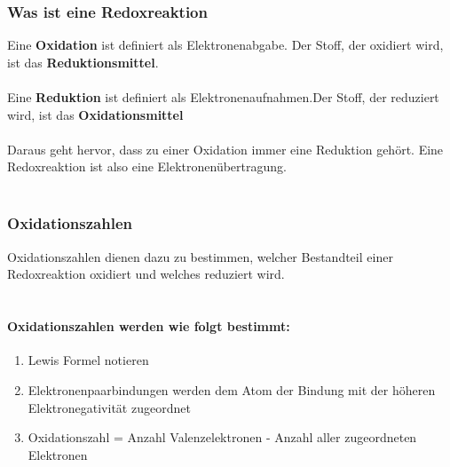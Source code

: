 \documentclass[a4paper]{report}
\begin{document}
\subsubsection{Was ist eine Redoxreaktion}
Eine \textbf{Oxidation} ist definiert als Elektronenabgabe. Der Stoff, der oxidiert wird, ist das \textbf{Reduktionsmittel}.\\\\
Eine \textbf{Reduktion} ist definiert als Elektronenaufnahmen.Der Stoff, der reduziert wird, ist das \textbf{Oxidationsmittel}\\\\
Daraus geht hervor, dass zu einer Oxidation immer eine Reduktion gehört. Eine Redoxreaktion ist also eine Elektronenübertragung.\\\\

\subsubsection{Oxidationszahlen}
Oxidationszahlen dienen dazu zu bestimmen, welcher Bestandteil einer Redoxreaktion oxidiert und welches reduziert wird.\\\\

\paragraph{Oxidationszahlen werden wie folgt bestimmt:}
\begin{enumerate}
    \item Lewis Formel notieren
    \item Elektronenpaarbindungen werden dem Atom der Bindung mit der höheren Elektronegativität zugeordnet
    \item Oxidationszahl = Anzahl Valenzelektronen - Anzahl aller zugeordneten Elektronen\\\\
\end{enumerate}
\end{document}
